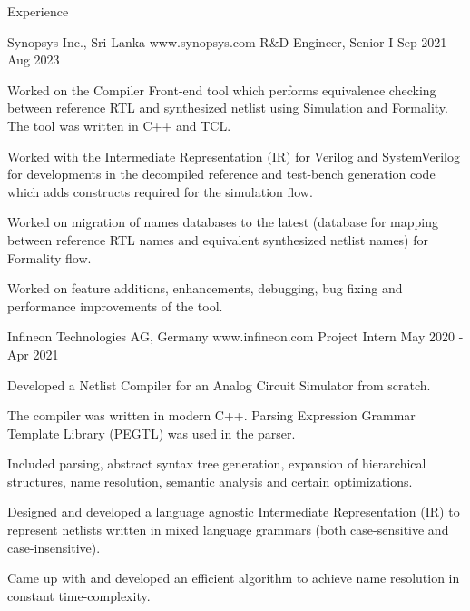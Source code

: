 \documentclass[
	11pt, %
]{./../assets/resume} %
\begin{document}

\begin{rSection}{Experience}

	\begin{rExperienceOnePos} {Synopsys Inc., Sri  Lanka} {www.synopsys.com}
    {R\&D Engineer, Senior I} {Sep 2021 - Aug 2023}
        \item
        Worked on the Compiler Front-end tool which performs equivalence checking between reference RTL and synthesized netlist using Simulation and Formality. The tool was written in C++ and TCL.
        \item
        Worked with the Intermediate Representation (IR) for Verilog and SystemVerilog for developments in the decompiled reference and test-bench generation code which adds constructs required for the simulation flow.
        \item
        Worked on migration of names databases to the latest (database for mapping between reference RTL names and equivalent synthesized netlist names) for Formality flow.
        \item
        Worked on feature additions, enhancements, debugging, bug fixing and performance improvements of the tool.
	\end{rExperienceOnePos}

	\begin{rExperienceOnePos} {Infineon Technologies AG, Germany} {www.infineon.com}
    {Project Intern} {May 2020 - Apr 2021}
        \item
        Developed a Netlist Compiler for an Analog Circuit Simulator from scratch.
        \item
        The compiler was written in modern C++. Parsing Expression Grammar Template Library (PEGTL) was used in the parser.
        \item
        Included parsing, abstract syntax tree generation, expansion of hierarchical structures, name resolution, semantic analysis and certain optimizations.
        \item
        Designed and developed a language agnostic Intermediate Representation (IR) to represent netlists written in mixed language grammars (both case-sensitive and case-insensitive).
        \item
        Came up with and developed an efficient algorithm to achieve name resolution in constant time-complexity.
	\end{rExperienceOnePos}


\end{rSection}
\end{document}
